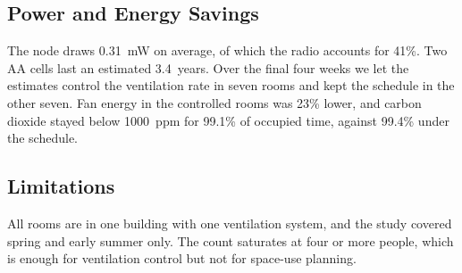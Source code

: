 \subsection{Power and Energy Savings}
The node draws 0.31~mW on average, of which the radio accounts for 41\%. Two AA cells last an estimated 3.4~years. Over the final four weeks we let the estimates control the ventilation rate in seven rooms and kept the schedule in the other seven. Fan energy in the controlled rooms was 23\% lower, and carbon dioxide stayed below 1000~ppm for 99.1\% of occupied time, against 99.4\% under the schedule.

\subsection{Limitations}
All rooms are in one building with one ventilation system, and the study covered spring and early summer only. The count saturates at four or more people, which is enough for ventilation control but not for space-use planning.
